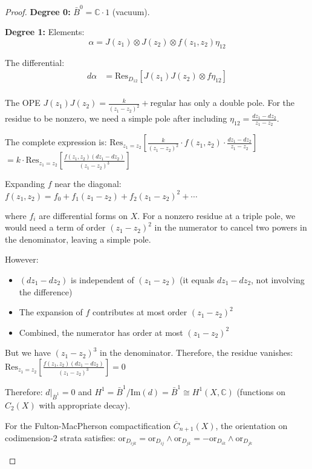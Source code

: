 \begin{proof}
\textbf{Degree 0:} $\bar{B}^0 = \mathbb{C} \cdot 1$ (vacuum).
 
\textbf{Degree 1:} Elements:
\[
\alpha = J(z_1) \otimes J(z_2) \otimes f(z_1,z_2)\eta_{12}
\]
 
The differential:
\begin{align}
d\alpha &= \text{Res}_{D_{12}}\left[J(z_1)J(z_2) \otimes f\eta_{12}\right] \\
\end{align}

The OPE $J(z_1)J(z_2) = \frac{k}{(z_1-z_2)^2} + \text{regular}$ has only a double pole. For the residue to be nonzero, we need a simple pole after including $\eta_{12} = \frac{dz_1 - dz_2}{z_1 - z_2}$.

The complete expression is:
$\text{Res}_{z_1=z_2}\left[\frac{k}{(z_1 - z_2)^2} \cdot f(z_1, z_2) \cdot \frac{dz_1 - dz_2}{z_1 - z_2}\right]$
$= k \cdot \text{Res}_{z_1=z_2}\left[\frac{f(z_1, z_2)(dz_1 - dz_2)}{(z_1 - z_2)^3}\right]$

Expanding $f$ near the diagonal:
$f(z_1, z_2) = f_0 + f_1(z_1 - z_2) + f_2(z_1 - z_2)^2 + \cdots$

where $f_i$ are differential forms on $X$. For a nonzero residue at a triple pole, we would need a term of order $(z_1 - z_2)^2$ in the numerator to cancel two powers in the denominator, leaving a simple pole.

However:
\begin{itemize}
\item $(dz_1 - dz_2)$ is independent of $(z_1 - z_2)$ (it equals $dz_1 - dz_2$, not involving the difference)
\item The expansion of $f$ contributes at most order $(z_1 - z_2)^2$
\item Combined, the numerator has order at most $(z_1 - z_2)^2$
\end{itemize}

But we have $(z_1 - z_2)^3$ in the denominator. Therefore, the residue vanishes:
$\text{Res}_{z_1=z_2}\left[\frac{f(z_1, z_2)(dz_1 - dz_2)}{(z_1 - z_2)^3}\right] = 0$

Therefore:
$d|_{\bar{B}^1} = 0$
and $H^1 = \bar{B}^1/\text{Im}(d) = \bar{B}^1 \cong H^1(X, \mathbb{C})$ (functions on $C_2(X)$ with appropriate decay).

\begin{lemma}\label{lem:orientation}
For the Fulton-MacPherson compactification $\overline{C}_{n+1}(X)$, the orientation on codimension-2 strata satisfies:
$\text{or}_{D_{ijk}} = \text{or}_{D_{ij}} \wedge \text{or}_{D_{jk}} = -\text{or}_{D_{ik}} \wedge \text{or}_{D_{jk}}$
\end{lemma}


\end{proof}
